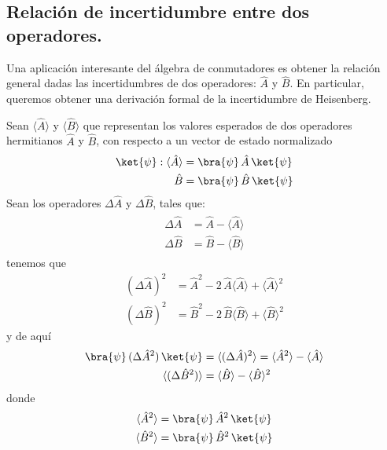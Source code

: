 \subsection{Relación de incertidumbre entre dos operadores.}
Una aplicación interesante del álgebra de conmutadores es obtener la relación general dadas las incertidumbres de dos operadores: $\hat{A}$ y $\hat{B}$. En particular, queremos obtener una derivación formal de la incertidumbre de Heisenberg.
\par
Sean $\langle \hat{A} \rangle$ y $ \langle \hat{B} \rangle$ que representan los valores esperados de dos operadores hermitianos $\hat{A}$ y $\hat{B}$, con respecto a un vector de estado normalizado 
\begin{align*}
\ket{\psi}: \langle \hat{A} \rangle &= \bra{\psi} \, \hat{A} \, \ket{\psi} \\
\hat{B} &= \bra{\psi} \, \hat{B} \, \ket{\psi}
\end{align*}
Sean los operadores $\Delta \hat{A}$ y $\Delta \hat{B}$, tales que:
\begin{align}
\begin{aligned}
\Delta \hat{A} &= \hat{A} - \langle \hat{A} \rangle \\
\Delta \hat{B} &= \hat{B} - \langle \hat{B} \rangle
\end{aligned}
\label{eq:ecuacion_02_95}
\end{align}
tenemos que
\begin{align*}
(\Delta \hat{A})^{2} &= \hat{A}^{2} - 2 \, \hat{A} \langle \hat{A} \rangle + \langle \hat{A} \rangle^{2} \\
(\Delta \hat{B})^{2} &= \hat{B}^{2} - 2 \, \hat{B} \langle \hat{B} \rangle + \langle \hat{B} \rangle^{2}
\end{align*}
y de aquí
\begin{align}
\begin{aligned}
\bra{\psi} \, (\Delta \hat{A}^{2}) \, \ket{\psi} &= \langle (\Delta \hat{A})^{2} \rangle = \langle \hat{A}^{2} \rangle - \langle \hat{A} \rangle \\
\langle (\Delta \hat{B}^{2}) \rangle &= \langle \hat{B} \rangle - \langle \hat{B} \rangle^{2}
\end{aligned}
\label{eq:ecuacion_02_96}
\end{align}
donde
\begin{align*}
\langle \hat{A}^{2} \rangle &= \bra{\psi} \, \hat{A}^{2} \, \ket{\psi} \\
\langle \hat{B}^{2} \rangle &= \bra{\psi} \, \hat{B}^{2} \, \ket{\psi}
\end{align*}
